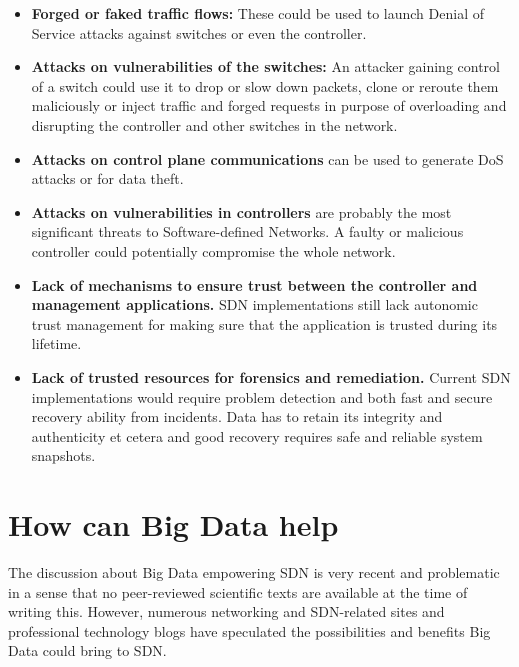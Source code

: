 \documentclass{acm_proc_article-sp}
\begin{document}
\begin{itemize}
\item \textbf{Forged or faked traffic flows:} These could be used to launch Denial of Service attacks against switches or even the controller.
\item \textbf{Attacks on vulnerabilities of the switches:} An attacker gaining control of a switch could use it to drop or slow down packets, clone or reroute them maliciously or inject traffic and forged requests in purpose of overloading and disrupting the controller and other switches in the network.
\item \textbf{Attacks on control plane communications} can be used to generate DoS attacks or for data theft.
\item \textbf{Attacks on vulnerabilities in controllers} are probably the most significant threats to Software-defined Networks. A faulty or malicious controller could potentially compromise the whole network.
\item \textbf{Lack of mechanisms to ensure trust between the controller and management applications.} SDN implementations still lack autonomic trust management for making sure that the application is trusted during its lifetime.
\item \textbf{Lack of trusted resources for forensics and remediation.} Current SDN implementations would require problem detection and both fast and secure recovery ability from incidents. Data has to retain its integrity and authenticity et cetera and good recovery requires safe and reliable system snapshots.
\end{itemize}

\section{How can Big Data help}

The discussion about Big Data empowering SDN is very recent and problematic in a sense that no peer-reviewed scientific texts are available at the time of writing this. However, numerous networking and SDN-related sites and professional technology blogs have speculated the possibilities and benefits Big Data could bring to SDN.
\end{document}
